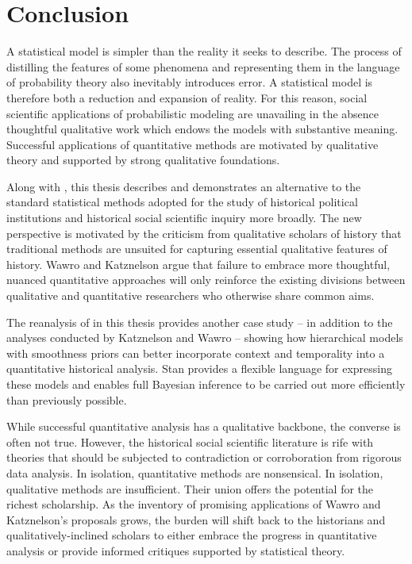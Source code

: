 \chapter{Conclusion}
\label{discussion}

A statistical model is simpler than the reality it seeks to describe. The process of 
distilling the features of some phenomena and representing them in the language of 
probability theory also inevitably introduces error. A statistical model is therefore both 
a reduction and expansion of reality. For this reason, social scientific applications of 
probabilistic modeling are unavailing in the absence thoughtful qualitative work which
endows the models with substantive meaning. Successful applications of quantitative 
methods are motivated by qualitative theory and supported by strong qualitative foundations. 

Along with , this thesis describes and demonstrates 
an alternative to the standard statistical methods adopted for the study of historical 
political institutions and historical social scientific inquiry more broadly. The new perspective is 
motivated by the criticism from qualitative scholars of history that traditional methods 
are unsuited for capturing essential qualitative features of history. 
Wawro and Katznelson argue that failure to embrace more thoughtful, nuanced quantitative 
approaches will only reinforce the existing divisions between qualitative and quantitative 
researchers who otherwise share common aims. 

The reanalysis of  in this thesis provides another 
case study -- in addition to the analyses conducted by Katznelson and Wawro -- showing 
how hierarchical models with smoothness priors can better incorporate context and 
temporality into a quantitative historical analysis. Stan provides a flexible language 
for expressing these models and enables full Bayesian inference to be carried out 
more efficiently than previously possible.  

While successful quantitative analysis has a qualitative backbone, the converse
is often not true. However, the historical social scientific literature is rife with 
theories that should be subjected to contradiction or corroboration from rigorous 
data analysis. In isolation, quantitative methods are nonsensical. In isolation,
qualitative methods are insufficient. Their union offers the potential for the richest 
scholarship.  As the inventory of promising applications of Wawro and 
Katznelson's proposals grows, the burden will shift back to the historians and 
qualitatively-inclined scholars to either embrace the progress in quantitative analysis 
or provide informed critiques supported by statistical theory. 

